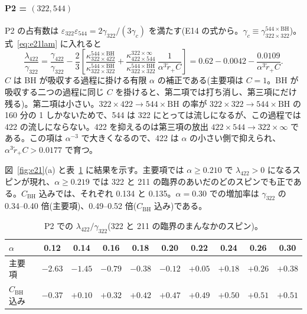 \paragraph{P2 = $(322,544)$}
P2 の占有数は $\varepsilon_{322}\varepsilon_{544}=2\gamma_{322}/(3\gamma_c)$ を満たす(E14 の式から。$\gamma_c\equiv\gamma^{544\times\mathrm{BH}}_{322\times322}$)。式~\eqref{eq:e21lam} に入れると
\begin{equation}
\frac{\lambda_{422}}{\gamma_{322}}=\frac{\gamma_{422}}{\gamma_{322}}-\frac23\left[\frac{\kappa^{544\times\mathrm{BH}}_{322\times422}}{\kappa^{544\times\mathrm{BH}}_{322\times322}}
+\frac{\kappa^{322\times\infty}_{422\times544}}{\kappa^{544\times\mathrm{BH}}_{322\times322}}\,\frac{1}{\alpha^3\tilde r_+C}\right]
=0.62-0.0042-\frac{0.0109}{\alpha^3\tilde r_+C}.
\label{eq:e21p2}
\end{equation}
$C$ は BH が吸収する過程に掛ける有限 $\alpha$ の補正である(主要項は $C=1$。BH が吸収する二つの過程に同じ $C$ を掛けると、第二項では打ち消し、第三項にだけ残る)。第二項は小さい。$322\times422\to544\times\mathrm{BH}$ の率が $322\times322\to544\times\mathrm{BH}$ の 160 分の 1 しかないためで、544 は 322 にとっては流しになるが、この過程では 422 の流しにならない。422 を抑えるのは第三項の放出 $422\times544\to322\times\infty$ である。この項は $\alpha^{-3}$ で大きくなるので、422 は $\alpha$ の小さい側で抑えられ、$\alpha^3\tilde r_+C>0.0177$ で育つ。

図~\ref{fig:e21}(a) と表~\ref{tab:e21lam} に結果を示す。主要項では $\alpha\ge0.210$ で $\lambda_{422}>0$ になるスピンが現れ、$\alpha\ge0.219$ では 322 と 211 の臨界のあいだのどのスピンでも正である。$C_\mathrm{BH}$ 込みでは、それぞれ 0.134 と 0.135。$\alpha=0.30$ での増加率は $\gamma_{322}$ の 0.34--0.40 倍(主要項)、0.49--0.52 倍($C_\mathrm{BH}$ 込み)である。

\begin{table}[H]
\centering\small
\begin{tabular}{lccccccccc}
\toprule
$\alpha$ & 0.12 & 0.14 & 0.16 & 0.18 & 0.20 & 0.22 & 0.24 & 0.26 & 0.30\\
\midrule
主要項 & $-2.63$ & $-1.45$ & $-0.79$ & $-0.38$ & $-0.12$ & $+0.05$ & $+0.18$ & $+0.26$ & $+0.38$\\
$C_\mathrm{BH}$ 込み & $-0.37$ & $+0.10$ & $+0.32$ & $+0.42$ & $+0.47$ & $+0.49$ & $+0.50$ & $+0.51$ & $+0.51$\\
\bottomrule
\end{tabular}
\caption{P2 での $\lambda_{422}/\gamma_{322}$(322 と 211 の臨界のまんなかのスピン)。}
\label{tab:e21lam}
\end{table}

